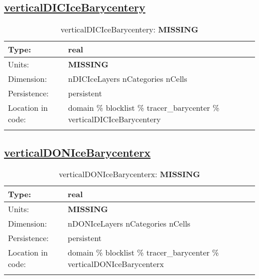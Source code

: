 \subsection[verticalDICIceBarycentery]{\hyperref[sec:var_tab_tracer_barycenter]{verticalDICIceBarycentery}}
\label{subsec:var_sec_tracer_barycenter_verticalDICIceBarycentery}
\begin{center}
\begin{longtable}{| p{2.0in} | p{4.0in} |}
        \hline 
        Type: & real \\
        \hline 
        Units: & {\bf \color{red} MISSING} \\
        \hline 
        Dimension: & nDICIceLayers nCategories nCells \\
        \hline 
        Persistence: & persistent \\
        \hline 
         Location in code: & domain \% blocklist \% tracer\_barycenter \% verticalDICIceBarycentery \\
         \hline 
    \caption{verticalDICIceBarycentery: {\bf \color{red} MISSING}}
\end{longtable}
\end{center}
\subsection[verticalDONIceBarycenterx]{\hyperref[sec:var_tab_tracer_barycenter]{verticalDONIceBarycenterx}}
\label{subsec:var_sec_tracer_barycenter_verticalDONIceBarycenterx}
\begin{center}
\begin{longtable}{| p{2.0in} | p{4.0in} |}
        \hline 
        Type: & real \\
        \hline 
        Units: & {\bf \color{red} MISSING} \\
        \hline 
        Dimension: & nDONIceLayers nCategories nCells \\
        \hline 
        Persistence: & persistent \\
        \hline 
         Location in code: & domain \% blocklist \% tracer\_barycenter \% verticalDONIceBarycenterx \\
         \hline 
    \caption{verticalDONIceBarycenterx: {\bf \color{red} MISSING}}
\end{longtable}
\end{center}
